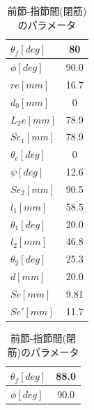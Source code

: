 %
\begin{table}[htbp]
\begin{minipage}{0.5\hsize}
  \centering
  \vspace{5mm}
  \caption{前節-指節間(開筋)のパラメータ}
  \label{tab:parameta_3_1}
  \vspace{-3mm}
  \begin{tabular}{|l|c|}
  \hline
  $\theta _f[deg]$ & 80                           \\ \hline
  $\phi[deg]     $ & 90.0                         \\ \hline
  $re[mm]        $ & 16.7                         \\ \hline
  $d_0[mm]       $ & 0                            \\ \hline
  $L_Te[mm]      $ & 78.9                         \\ \hline
  $Se_1[mm]      $ & 78.9                         \\ \hline
  $\theta_e[deg] $ & 0                            \\ \hline
  $\psi[deg]     $ & 12.6                         \\ \hline
  $Se_2[mm]      $ & 90.5                         \\ \hline
  $l_1[mm]       $ & 58.5                         \\ \hline
  $\theta_1[deg] $ & 20.0                         \\ \hline
  $l_2[mm]       $ & 46.8                         \\ \hline
  $\theta_2[deg] $ & 25.3                         \\ \hline
  $d[mm]         $ & 20.0                         \\ \hline
  $Se[mm]        $ & 9.81                         \\ \hline
  $Se'[mm]       $ & 11.7                         \\ \hline
  \end{tabular}
\end{minipage}
%
\begin{minipage}{0.5\hsize}
  \centering
  \vspace{5mm}
  \caption{前節-指節間(閉筋)のパラメータ}
  \label{tab:parameta_3_2}
  \vspace{-3mm}
  \begin{tabular}{|l|c|}
  \hline
  $\theta _f[deg]$ & 88.0                         \\ \hline
  $\phi[deg]     $ & 90.0                         \\ \hline

\end{tabular}
\end{minipage}
\end{table}
